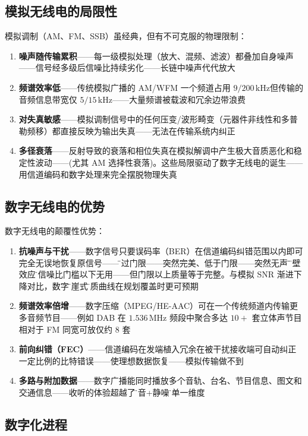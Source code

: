 \documentclass[12pt,UTF8]{ctexbook}
\begin{document}
\subsection{模拟无线电的局限性}

模拟调制（AM、FM、SSB）虽经典，但有不可克服的物理限制：
\begin{enumerate}
\item \textbf{噪声随传输累积}——每一级模拟处理（放大、混频、滤波）都叠加自身噪声——信号经多级后信噪比持续劣化——长链中噪声代代放大
\item \textbf{频谱效率低}——传统模拟广播的 AM/WFM 一个频道占用 $9/200\,\mathrm{kHz}$但传输的音频信息带宽仅 $5/15\,\mathrm{kHz}$——大量频谱被载波和冗余边带浪费
\item \textbf{对失真敏感}——模拟调制信号中的任何压变/波形畸变（元器件非线性和多普勒频移）都直接反映为输出失真——无法在传输系统内纠正
\item \textbf{多径衰落}——反射导致的衰落和相位失真在模拟解调中产生极大音质恶化和稳定性波动——(尤其 AM 选择性衰落)。这些局限驱动了数字无线电的诞生——用信道编码和数字处理来完全摆脱物理失真
\end{enumerate}

\subsection{数字无线电的优势}

数字无线电的颠覆性优势：
\begin{enumerate}
\item \textbf{抗噪声与干扰}——数字信号只要误码率（BER）在信道编码纠错范围以内即可完全无误地恢复原信号——\"超过门限——突然完美、低于门限——突然无声\"的\"峭壁效应\"让信噪比门槛以下无用——但门限以上质量等于完整。与模拟 SNR 渐进下降对比，数字\"悬崖式\"品质曲线在规划覆盖时更可预期
\item \textbf{频谱效率倍增}——数字压缩（MPEG/HE-AAC）可在一个传统频道内传输更多音频节目——例如 DAB 在 $1.536\,\mathrm{MHz}$ 频段中聚合多达 $10+$ 套立体声节目相对于 FM 同宽可放仅约 8 套
\item \textbf{前向纠错（FEC）}——信道编码在发端植入冗余在被干扰接收端可自动纠正一定比例的比特错误——使理想数据恢复——模拟传输做不到
\item \textbf{多路与附加数据}——数字广播能同时播放多个音轨、台名、节目信息、图文和交通信息——收听的体验超越了\"声音+静噪\"的单一维度
\end{enumerate}

\subsection{数字化进程}
\end{document}
